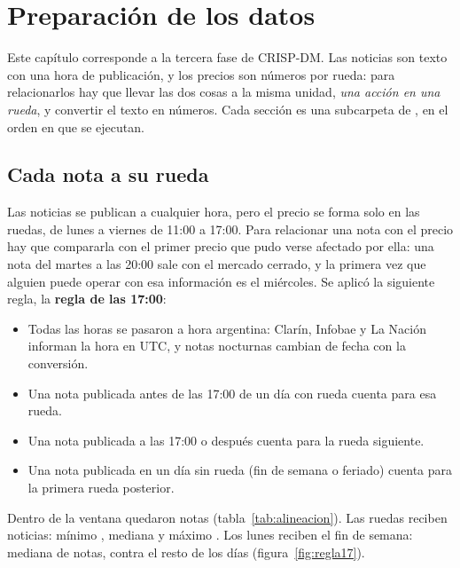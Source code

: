 \chapter{Preparación de los datos}
\label{cap:preparacion}

Este capítulo corresponde a la tercera fase de CRISP-DM. Las noticias son texto con una hora de
publicación, y los precios son números por rueda: para relacionarlos hay que llevar las dos cosas
a la misma unidad, \textit{una acción en una rueda}, y convertir el texto en números. Cada sección
es una subcarpeta de , en el orden en que se ejecutan.

\section{Cada nota a su rueda}
\label{sec:alineacion}

Las noticias se publican a cualquier hora, pero el precio se forma solo en las ruedas, de lunes a
viernes de 11:00 a 17:00. Para relacionar una nota con el precio hay que compararla con el primer
precio que pudo verse afectado por ella: una nota del martes a las 20:00 sale con el mercado
cerrado, y la primera vez que alguien puede operar con esa información es el miércoles. Se aplicó
la siguiente regla, la \textbf{regla de las 17:00}:

\begin{itemize}
  \item Todas las horas se pasaron a hora argentina: Clarín, Infobae y La Nación informan la hora
        en UTC, y  notas nocturnas cambian de fecha con la
        conversión.
  \item Una nota publicada antes de las 17:00 de un día con rueda cuenta para esa rueda.
  \item Una nota publicada a las 17:00 o después cuenta para la rueda siguiente.
  \item Una nota publicada en un día sin rueda (fin de semana o feriado) cuenta para la primera
        rueda posterior.
\end{itemize}

Dentro de la ventana quedaron  notas
(tabla~\ref{tab:alineacion}). Las  ruedas reciben noticias: mínimo
, mediana  y máximo
. Los lunes reciben el fin de semana: mediana de
 notas, contra  el resto de los
días (figura~\ref{fig:regla17}).

